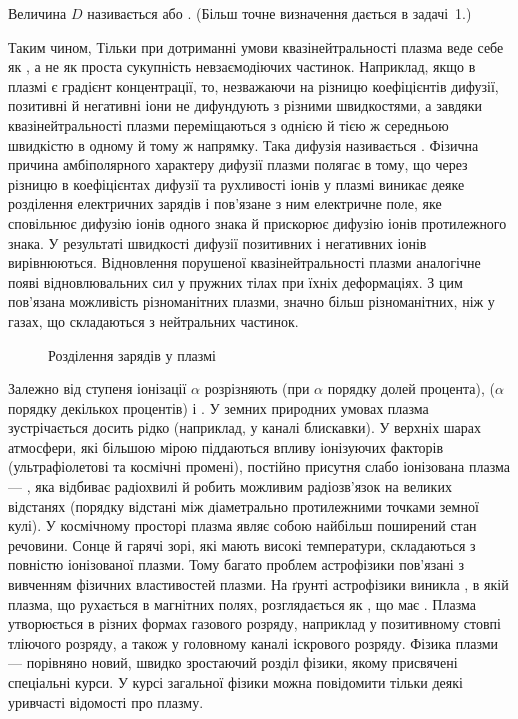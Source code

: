 Величина $D$ називається  або . (Більш точне визначення дається в задачі~1.)

Таким чином,  Тільки при дотриманні умови квазінейтральності плазма веде себе як , а не як проста сукупність невзаємодіючих частинок. Наприклад, якщо в плазмі є градієнт концентрації, то, незважаючи на різницю коефіцієнтів
дифузії, позитивні й негативні іони не дифундують з різними швидкостями, а завдяки квазінейтральності плазми переміщаються з однією й тією ж середньою швидкістю в одному й тому ж напрямку. Така дифузія називається . Фізична причина амбіполярного характеру дифузії плазми полягає в тому, що через різницю в коефіцієнтах дифузії та рухливості іонів у плазмі виникає деяке розділення електричних зарядів і пов'язане з ним електричне поле, яке сповільнює дифузію іонів одного знака й прискорює дифузію іонів протилежного знака. У результаті швидкості дифузії позитивних і негативних іонів вирівнюються. Відновлення порушеної квазінейтральності плазми аналогічне появі відновлювальних сил у пружних тілах при їхніх деформаціях. З цим пов'язана можливість різноманітних  плазми, значно більш різноманітних, ніж у газах, що складаються з нейтральних частинок.

\begin{figure}[h!]\centering
	\caption{Розділення зарядів у плазмі}
	\label{pic:charge-separation}
\end{figure}


Залежно від ступеня іонізації $\alpha$ розрізняють  (при $\alpha$ порядку долей процента),  ($\alpha$ порядку декількох процентів) і . У земних природних умовах плазма зустрічається досить рідко (наприклад, у каналі блискавки). У верхніх шарах атмосфери, які більшою мірою піддаються впливу іонізуючих факторів (ультрафіолетові та космічні промені), постійно присутня слабо іонізована плазма --- , яка відбиває радіохвилі й робить можливим радіозв'язок на великих відстанях (порядку відстані між діаметрально протилежними точками земної кулі). У космічному просторі плазма являє собою найбільш поширений стан речовини. Сонце й гарячі зорі, які мають високі температури, складаються з повністю іонізованої плазми. Тому багато проблем астрофізики пов'язані з вивченням фізичних властивостей плазми. На ґрунті астрофізики виникла , в якій плазма, що рухається в магнітних полях, розглядається як , що має . Плазма утворюється в різних формах газового розряду, наприклад у позитивному стовпі тліючого розряду, а також у головному каналі іскрового розряду. Фізика плазми --- порівняно новий, швидко зростаючий розділ фізики, якому присвячені спеціальні курси. У курсі загальної фізики можна повідомити тільки деякі уривчасті відомості про плазму.


